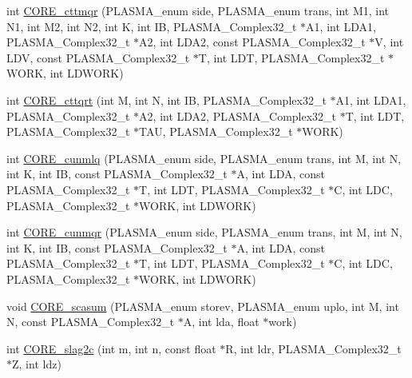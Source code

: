 \begin{DoxyCompactItemize}
\item 
int \hyperlink{group__CORE__PLASMA__Complex32__t_ga942a54bd176e5520d2605e607a0dd496_ga942a54bd176e5520d2605e607a0dd496}{C\+O\+R\+E\+\_\+cttmqr} (P\+L\+A\+S\+M\+A\+\_\+enum side, P\+L\+A\+S\+M\+A\+\_\+enum trans, int M1, int N1, int M2, int N2, int K, int I\+B, P\+L\+A\+S\+M\+A\+\_\+\+Complex32\+\_\+t $\ast$A1, int L\+D\+A1, P\+L\+A\+S\+M\+A\+\_\+\+Complex32\+\_\+t $\ast$A2, int L\+D\+A2, const P\+L\+A\+S\+M\+A\+\_\+\+Complex32\+\_\+t $\ast$V, int L\+D\+V, const P\+L\+A\+S\+M\+A\+\_\+\+Complex32\+\_\+t $\ast$T, int L\+D\+T, P\+L\+A\+S\+M\+A\+\_\+\+Complex32\+\_\+t $\ast$W\+O\+R\+K, int L\+D\+W\+O\+R\+K)
\item 
int \hyperlink{group__CORE__PLASMA__Complex32__t_gacdf604a4fa8379f693539966b7c3c3c6_gacdf604a4fa8379f693539966b7c3c3c6}{C\+O\+R\+E\+\_\+cttqrt} (int M, int N, int I\+B, P\+L\+A\+S\+M\+A\+\_\+\+Complex32\+\_\+t $\ast$A1, int L\+D\+A1, P\+L\+A\+S\+M\+A\+\_\+\+Complex32\+\_\+t $\ast$A2, int L\+D\+A2, P\+L\+A\+S\+M\+A\+\_\+\+Complex32\+\_\+t $\ast$T, int L\+D\+T, P\+L\+A\+S\+M\+A\+\_\+\+Complex32\+\_\+t $\ast$T\+A\+U, P\+L\+A\+S\+M\+A\+\_\+\+Complex32\+\_\+t $\ast$W\+O\+R\+K)
\item 
int \hyperlink{group__CORE__PLASMA__Complex32__t_ga146c90c6b590a52e1c5a945b16364b3e_ga146c90c6b590a52e1c5a945b16364b3e}{C\+O\+R\+E\+\_\+cunmlq} (P\+L\+A\+S\+M\+A\+\_\+enum side, P\+L\+A\+S\+M\+A\+\_\+enum trans, int M, int N, int K, int I\+B, const P\+L\+A\+S\+M\+A\+\_\+\+Complex32\+\_\+t $\ast$A, int L\+D\+A, const P\+L\+A\+S\+M\+A\+\_\+\+Complex32\+\_\+t $\ast$T, int L\+D\+T, P\+L\+A\+S\+M\+A\+\_\+\+Complex32\+\_\+t $\ast$C, int L\+D\+C, P\+L\+A\+S\+M\+A\+\_\+\+Complex32\+\_\+t $\ast$W\+O\+R\+K, int L\+D\+W\+O\+R\+K)
\item 
int \hyperlink{group__CORE__PLASMA__Complex32__t_gaa733869e9c9d2b29204aaf799dfab70b_gaa733869e9c9d2b29204aaf799dfab70b}{C\+O\+R\+E\+\_\+cunmqr} (P\+L\+A\+S\+M\+A\+\_\+enum side, P\+L\+A\+S\+M\+A\+\_\+enum trans, int M, int N, int K, int I\+B, const P\+L\+A\+S\+M\+A\+\_\+\+Complex32\+\_\+t $\ast$A, int L\+D\+A, const P\+L\+A\+S\+M\+A\+\_\+\+Complex32\+\_\+t $\ast$T, int L\+D\+T, P\+L\+A\+S\+M\+A\+\_\+\+Complex32\+\_\+t $\ast$C, int L\+D\+C, P\+L\+A\+S\+M\+A\+\_\+\+Complex32\+\_\+t $\ast$W\+O\+R\+K, int L\+D\+W\+O\+R\+K)
\item 
void \hyperlink{group__CORE__PLASMA__Complex32__t_gadc7bf683e0afadd77075b49c827cc016_gadc7bf683e0afadd77075b49c827cc016}{C\+O\+R\+E\+\_\+scasum} (P\+L\+A\+S\+M\+A\+\_\+enum storev, P\+L\+A\+S\+M\+A\+\_\+enum uplo, int M, int N, const P\+L\+A\+S\+M\+A\+\_\+\+Complex32\+\_\+t $\ast$A, int lda, float $\ast$work)
\item 
int \hyperlink{group__CORE__PLASMA__Complex32__t_ga2fb0a8db5844612734c55602fe3f38b1_ga2fb0a8db5844612734c55602fe3f38b1}{C\+O\+R\+E\+\_\+slag2c} (int m, int n, const float $\ast$R, int ldr, P\+L\+A\+S\+M\+A\+\_\+\+Complex32\+\_\+t $\ast$Z, int ldz)
\end{DoxyCompactItemize}



